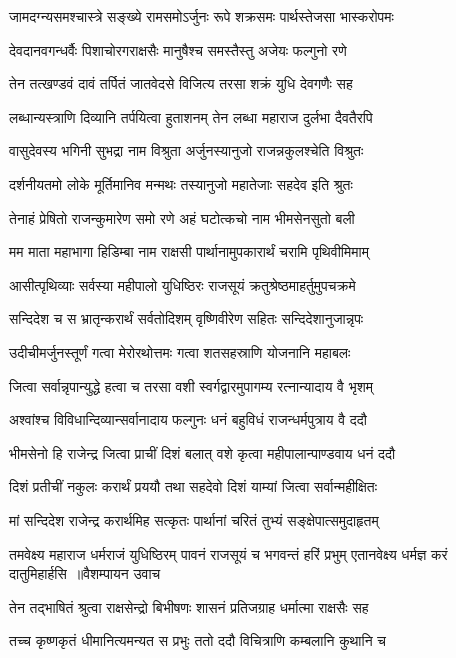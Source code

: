 \twolineshloka
{जामदग्न्यसमश्चास्त्रे सङ्ख्ये रामसमोऽर्जुनः}
{रूपे शक्रसमः पार्थस्तेजसा भास्करोपमः}


\twolineshloka
{देवदानवगन्धर्वैः पिशाचोरगराक्षसैः}
{मानुषैश्च समस्तैस्तु अजेयः फल्गुनो रणे}


\twolineshloka
{तेन तत्खण्डवं दावं तर्पितं जातवेदसे}
{विजित्य तरसा शक्रं युधि देवगणैः सह}


\twolineshloka
{लब्धान्यस्त्राणि दिव्यानि तर्पयित्वा हुताशनम्}
{तेन लब्धा महाराज दुर्लभा दैवतैरपि}


\twolineshloka
{वासुदेवस्य भगिनी सुभद्रा नाम विश्रुता}
{अर्जुनस्यानुजो राजन्नकुलश्चेति विश्रुतः}


\twolineshloka
{दर्शनीयतमो लोके मूर्तिमानिव मन्मथः}
{तस्यानुजो महातेजाः सहदेव इति श्रुतः}


\twolineshloka
{तेनाहं प्रेषितो राजन्कुमारेण समो रणे}
{अहं घटोत्कचो नाम भीमसेनसुतो बली}


\twolineshloka
{मम माता महाभागा हिडिम्बा नाम राक्षसी}
{पार्थानामुपकारार्थं चरामि पृथिवीमिमाम्}


\twolineshloka
{आसीत्पृथिव्याः सर्वस्या महीपालो युधिष्ठिरः}
{राजसूयं क्रतुश्रेष्ठमाहर्तुमुपचक्रमे}


\twolineshloka
{सन्दिदेश च स भ्रातृन्करार्थं सर्वतोदिशम्}
{वृष्णिवीरेण सहितः सन्दिदेशानुजान्नृपः}


\twolineshloka
{उदीचीमर्जुनस्तूर्णं गत्वा मेरोरथोत्तमः}
{गत्वा शतसहस्राणि योजनानि महाबलः}


\twolineshloka
{जित्वा सर्वान्नृपान्युद्धे हत्वा च तरसा वशी}
{स्वर्गद्वारमुपागम्य रत्नान्यादाय वै भृशम्}


\twolineshloka
{अश्वांश्च विविधान्दिव्यान्सर्वानादाय फल्गुनः}
{धनं बहुविधं राजन्धर्मपुत्राय वै ददौ}


\twolineshloka
{भीमसेनो हि राजेन्द्र जित्वा प्राचीं दिशं बलात्}
{वशे कृत्वा महीपालान्पाण्डवाय धनं ददौ}


\twolineshloka
{दिशं प्रतीचीं नकुलः करार्थं प्रययौ तथा}
{सहदेवो दिशं याम्यां जित्वा सर्वान्महीक्षितः}


\twolineshloka
{मां सन्दिदेश राजेन्द्र करार्थमिह सत्कृतः}
{पार्थानां चरितं तुभ्यं सङ्क्षेपात्समुदाहृतम्}


\threelineshloka
{तमवेक्ष्य महाराज धर्मराजं युधिष्ठिरम्}
{पावनं राजसूयं च भगवन्तं हरिं प्रभुम्}
{एतानवेक्ष्य धर्मज्ञ करं दातुमिहार्हसि ॥वैशम्पायन उवाच}


\twolineshloka
{तेन तद्भाषितं श्रुत्वा राक्षसेन्द्रो बिभीषणः}
{शासनं प्रतिजग्राह धर्मात्मा राक्षसैः सह}


\twolineshloka
{तच्च कृष्णकृतं धीमानित्यमन्यत स प्रभुः}
{ततो ददौ विचित्राणि कम्बलानि कुथानि च}


